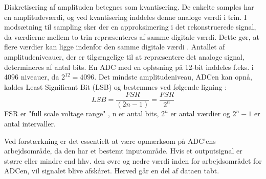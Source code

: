 Diskretisering af amplituden betegnes som kvantisering. De enkelte samples har en amplitudeværdi, og ved kvantisering inddeles denne analoge værdi i trin. I modsætning til sampling sker der en approksimering i det rekonstruerede signal, da værdierne mellem to trin repræsenteres af samme digitale værdi. Dette gør, at flere værdier kan ligge indenfor den samme digitale værdi \cite{Zouridakis2003}. Antallet af amplitudeniveauer, der er tilgængelige til at repræsentere det analoge signal, determineres af antal bits. En ADC med en opløsning på 12-bit inddeles f.eks. i 4096 niveauer, da $2^{12}=4096$. \cite{Konrad2006} Det mindste amplitudeniveau, ADCen kan opnå, kaldes Least Significant Bit (LSB) og bestemmes ved følgende ligning :
\begin{equation}\label{ligningLSB}
LSB = \frac{FSR}{(2n-1)} = \frac{FSR}{2^{n}}
\end{equation}
FSR er "full scale voltage range" , n er antal bits, $2^n$ er antal værdier og $2^{n}-1$ er antal intervaller. 

Ved forstærkning er det essentielt at være opmærksom på ADC'ens arbejdsområde, da den har et bestemt inputområde. Hvis et outputsignal er større eller mindre end hhv. den øvre og nedre værdi inden for arbejdsområdet for ADCen, vil signalet blive afskåret. Herved går en del af dataen tabt.  